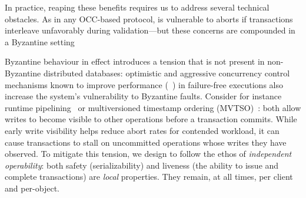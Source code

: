 In practice, reaping these benefits requires us to address several
technical obstacles. As in any OCC-based protocol, \sys
is vulnerable to aborts if transactions interleave unfavorably during
validation---but these concerns are compounded in a Byzantine
setting 

Byzantine behaviour in effect introduces a tension that is not present in non-Byzantine
distributed databases: optimistic and aggressive concurrency control mechanisms known
to improve performance (~\cite{kung1981occ,bernstein1983mcc,reed1983atomic,xie2015callas,zhang2015tapir}) in failure-free executions also increase the system's vulnerability to Byzantine faults.  Consider for instance runtime pipelining~\cite{xie2015callas,su2017tebaldi} or multiversioned timestamp ordering (MVTSO)~\cite{bernstein1983mcc,reed1983atomic}: both allow writes to become visible to other operations before a transaction commits. While early write visibility helps reduce abort rates for
contended workload, it can cause transactions to stall on uncommitted operations whose writes they have observed. To mitigate this tension, we design \sys{} to follow the ethos of \textit{independent operability}: both safety (serializability) and liveness (the ability to issue and complete transactions) are \textit{local} properties. They remain, at all times, per client and per-object.  





